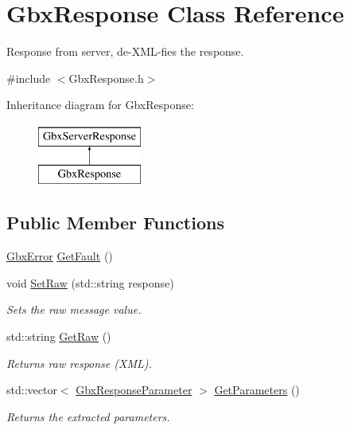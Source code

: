 \hypertarget{classGbxResponse}{\section{Gbx\-Response Class Reference}
\label{classGbxResponse}
}


Response from server, de-\/\-X\-M\-L-\/fies the response.  




{\ttfamily \#include $<$Gbx\-Response.\-h$>$}

Inheritance diagram for Gbx\-Response\-:\begin{figure}[H]
\begin{center}
\leavevmode
\includegraphics[height=2.000000cm]{classGbxResponse}
\end{center}
\end{figure}
\subsection*{Public Member Functions}
\begin{DoxyCompactItemize}
\item 
\hyperlink{structGbxError}{Gbx\-Error} \hyperlink{classGbxResponse_a42568c9c684b4c15f45b4f01056f24ad}{Get\-Fault} ()
\item 
void \hyperlink{classGbxResponse_aaf63a008c45be79f900e1131d0fb5565}{Set\-Raw} (std\-::string response)
\begin{DoxyCompactList}\small\item\em Sets the raw message value. \end{DoxyCompactList}\item 
\hypertarget{classGbxServerResponse_aa449d9a63899e1d1205e6ab916798ba6}{std\-::string \hyperlink{classGbxServerResponse_aa449d9a63899e1d1205e6ab916798ba6}{Get\-Raw} ()}\label{classGbxServerResponse_aa449d9a63899e1d1205e6ab916798ba6}

\begin{DoxyCompactList}\small\item\em Returns raw response (X\-M\-L). \end{DoxyCompactList}\item 
\hypertarget{classGbxServerResponse_a6d42bdaaeff3368e1fab2984940d2a2c}{std\-::vector$<$ \hyperlink{classGbxResponseParameter}{Gbx\-Response\-Parameter} $>$ \hyperlink{classGbxServerResponse_a6d42bdaaeff3368e1fab2984940d2a2c}{Get\-Parameters} ()}\label{classGbxServerResponse_a6d42bdaaeff3368e1fab2984940d2a2c}

\begin{DoxyCompactList}\small\item\em Returns the extracted parameters. \end{DoxyCompactList}\end{DoxyCompactItemize}
